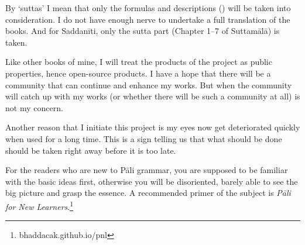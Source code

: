 By `suttas' I mean that only the formulas and descriptions () will be taken into consideration. I do not have enough nerve to undertake a full translation of the books. And for Saddanīti, only the sutta part (Chapter 1--7 of Suttamālā) is taken.

Like other books of mine, I will treat the products of the project as public properties, hence open-source products. I have a hope that there will be a community that can continue and enhance my works. But when the community will catch up with my works (or whether there will be such a community at all) is not my concern.

Another reason that I initiate this project is my eyes now get deteriorated quickly when used for a long time. This is a sign telling us that what should be done should be taken right away before it is too late.

For the readers who are new to Pāli grammar, you are supposed to be familiar with the basic ideas first, otherwise you will be disoriented, barely able to see the big picture and grasp the essence. A recommended primer of the subject is \emph{Pāli for New Learners}.\footnote{bhaddacak.github.io/pnl}
